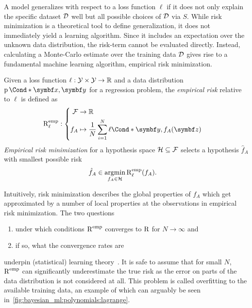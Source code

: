 A model generalizes with respect to a loss function $\ell$ if it does not only explain the specific dataset $\mathcal{D}$ well but all possible choices of $\mathcal{D}$ via $S$.
While risk minimization is a theoretical tool to define generalization, it does not immediately yield a learning algorithm.
Since it includes an expectation over the unknown data distribution, the risk-term cannot be evaluated directly.
Instead, calculating a Monte-Carlo estimate over the training data $\mathcal{D}$ gives rise to a fundamental machine learning algorithm, empirical risk minimization.

\begin{definition}
    \label{def:empirical_risk_minimization}
    Given a loss function $\ell: \mathcal{Y} \times \mathcal{Y} \to \mathbb{R}$ and a data distribution $\Prob*{\mat{x}, \mat{y}}$ for a regression problem, the \emph{empirical risk} relative to $\ell$ is defined as
    \begin{align}
        \risk^{\text{emp}}_\ell & : \left\{
        \begin{aligned}
            \Fc & \to \Rb                                                             \\
            f_A & \mapsto \frac{1}{N} \sum_{i=1}^N \Fun*{\ell}{\mat{y}, f_A(\mat{z})}
        \end{aligned}
        \right.
    \end{align}
    \emph{Empirical risk minimization} for a hypothesis space $\mathcal{H} \subseteq \mathcal{F}$ selects a hypothesis $\hat{f}_A$ with smallest possible risk
    \begin{align}
        \hat{f}_A & \in \operatorname*{argmin}_{f_A \in \mathcal{H}} \operatorname{R}^{\text{emp}}_\ell(f_A).
    \end{align}
\end{definition}

Intuitively, risk minimization describes the global properties of $f_A$ which get approximated by a number of local properties at the observations in empirical risk minimization.
The two questions
\begin{enumerate}
    \item under which conditions $\operatorname{R}^{\text{emp}}$ converges to $\operatorname{R}$ for $N \to \infty$ and
    \item if so, what the convergence rates are
\end{enumerate}
underpin (statistical) learning theory~\parencite{vapnik_principles_1992}.
It is safe to assume that for small $N$, $\operatorname{R}^{\text{emp}}$ can significantly underestimate the true risk as the error on parts of the data distribution is not considered at all.
This problem is called overfitting to the available training data, an example of which can arguably be seen in~\cref{fig:bayesian_ml:polynomials:lagrange}.

